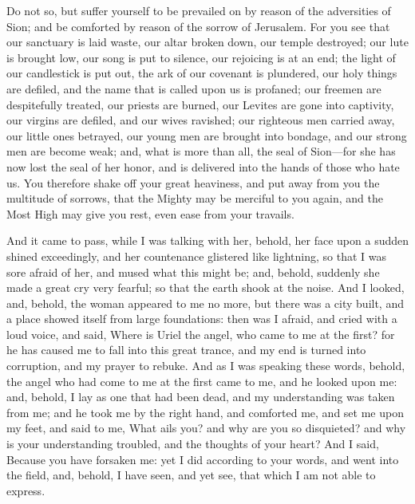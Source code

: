 {Do not so, but suffer yourself to be prevailed on by reason of the adversities of Sion; and be comforted by reason of the sorrow of Jerusalem.
For you see that our sanctuary is laid waste, our altar broken down, our temple destroyed;
our lute is brought low, our song is put to silence, our rejoicing is at an end; the light of our candlestick is put out, the ark of our covenant is plundered, our holy things are defiled, and the name that is called upon us is profaned; our freemen are despitefully treated, our priests are burned, our Levites are gone into captivity, our virgins are defiled, and our wives ravished; our righteous men carried away, our little ones betrayed, our young men are brought into bondage, and our strong men are become weak;
and, what is more than all, the seal of Sion—for she has now lost the seal of her honor, and is delivered into the hands of those who hate us.
You therefore shake off your great heaviness, and put away from you the multitude of sorrows, that the Mighty may be merciful to you again, and the Most High may give you rest, even ease from your travails.
\par }{\PP {}And it came to pass, while I was talking with her, behold, her face upon a sudden shined exceedingly, and her countenance glistered like lightning, so that I was sore afraid
 of her, and mused what this might be;
and, behold, suddenly she made a great cry very fearful; so that the earth shook at the noise.
And I looked, and, behold, the woman appeared to me no more, but there was a city built, and a place showed itself from large foundations: then was I afraid, and cried with a loud voice, and said,
Where is Uriel the angel, who came to me at the first? for he has caused me to fall into this great trance, and my end is turned into corruption, and my prayer to rebuke.
And as I was speaking these words, behold, the angel who had come to me at the first came to me, and he looked upon me:
and, behold, I lay as one that had been dead, and my understanding was taken from me; and he took me by the right hand, and comforted me, and set me upon my feet, and said to me,
What ails you? and why are you so disquieted? and why is your understanding troubled, and the thoughts of your heart?
And I said, Because you have forsaken me: yet I did according to your words, and went into the field, and, behold, I have seen, and yet see, that which I am not able to express.
}

